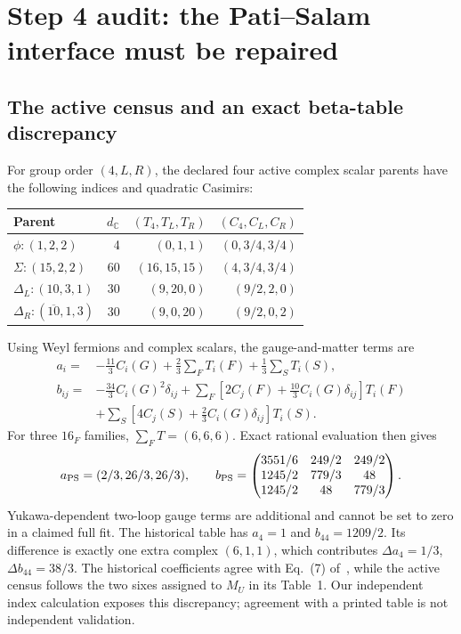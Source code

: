\documentclass[11pt]{article}
\begin{document}
\section{Step 4 audit: the Pati--Salam interface must be repaired}
\label{sec:PS}
\subsection{The active census and an exact beta-table discrepancy}
For group order $(4,L,R)$, the declared four active complex scalar parents
have the following indices and quadratic Casimirs:
\begin{center}
\begin{tabular}{lrrr}
\toprule
Parent & $d_{\mathbb C}$ & $(T_4,T_L,T_R)$ & $(C_4,C_L,C_R)$\\
\midrule
$\phi:(1,2,2)$&4&$(0,1,1)$&$(0,3/4,3/4)$\\
$\Sigma:(15,2,2)$&60&$(16,15,15)$&$(4,3/4,3/4)$\\
$\Delta_L:(10,3,1)$&30&$(9,20,0)$&$(9/2,2,0)$\\
$\Delta_R:(\overline{10},1,3)$&30&$(9,0,20)$&$(9/2,0,2)$\\
\bottomrule
\end{tabular}
\end{center}
Using Weyl fermions and complex scalars, the gauge-and-matter terms are
\begin{align}
 a_i={}&-\frac{11}{3}C_i(G)+\frac23\sum_FT_i(F)+\frac13\sum_ST_i(S),\\
 b_{ij}={}&-\frac{34}{3}C_i(G)^2\delta_{ij}
 +\sum_F[2C_j(F)+\tfrac{10}{3}C_i(G)\delta_{ij}]T_i(F)\nonumber\\
 &+\sum_S[4C_j(S)+\tfrac23C_i(G)\delta_{ij}]T_i(S).
\end{align}
For three $16_F$ families, $\sum_F T=(6,6,6)$. Exact rational evaluation
then gives
\begin{equation}
 a_{\rm PS}=(2/3,26/3,26/3),\qquad
 b_{\rm PS}=\begin{pmatrix}
3551/6&249/2&249/2\\1245/2&779/3&48\\1245/2&48&779/3
\end{pmatrix}.
\end{equation}
Yukawa-dependent two-loop gauge terms are additional and cannot be set to
zero in a claimed full fit. The historical table has $a_4=1$ and
$b_{44}=1209/2$. Its difference is exactly one extra complex $(6,1,1)$,
which contributes $\Delta a_4=1/3$, $\Delta b_{44}=38/3$.
The historical coefficients agree with Eq.~(7) of~\cite{BK}, while the
active census follows the two sixes assigned to $M_U$ in its Table~1.
Our independent index calculation exposes this discrepancy; agreement
with a printed table is not independent validation.
\end{document}
